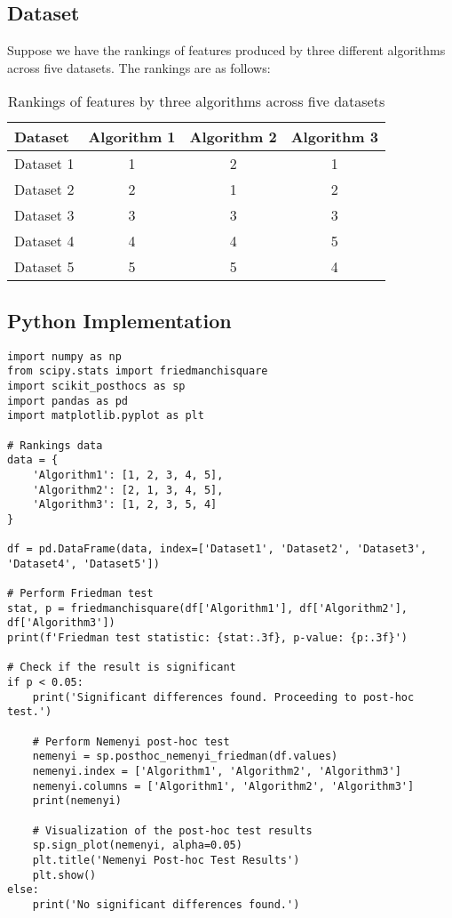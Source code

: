 \documentclass{article}
\begin{document}
\subsection*{Dataset}

Suppose we have the rankings of features produced by three different algorithms across five datasets. The rankings are as follows:

\begin{table}[h!]
\centering
\begin{tabular}{lccc}
\hline
\textbf{Dataset} & \textbf{Algorithm 1} & \textbf{Algorithm 2} & \textbf{Algorithm 3} \\
\hline
Dataset 1 & 1 & 2 & 1 \\
Dataset 2 & 2 & 1 & 2 \\
Dataset 3 & 3 & 3 & 3 \\
Dataset 4 & 4 & 4 & 5 \\
Dataset 5 & 5 & 5 & 4 \\
\hline
\end{tabular}
\caption{Rankings of features by three algorithms across five datasets}
\end{table}

\subsection*{Python Implementation}

\begin{lstlisting}[style=pythonstyle, caption={Python code for Friedman test and post-hoc analysis}]
import numpy as np
from scipy.stats import friedmanchisquare
import scikit_posthocs as sp
import pandas as pd
import matplotlib.pyplot as plt

# Rankings data
data = {
    'Algorithm1': [1, 2, 3, 4, 5],
    'Algorithm2': [2, 1, 3, 4, 5],
    'Algorithm3': [1, 2, 3, 5, 4]
}

df = pd.DataFrame(data, index=['Dataset1', 'Dataset2', 'Dataset3', 'Dataset4', 'Dataset5'])

# Perform Friedman test
stat, p = friedmanchisquare(df['Algorithm1'], df['Algorithm2'], df['Algorithm3'])
print(f'Friedman test statistic: {stat:.3f}, p-value: {p:.3f}')

# Check if the result is significant
if p < 0.05:
    print('Significant differences found. Proceeding to post-hoc test.')
    
    # Perform Nemenyi post-hoc test
    nemenyi = sp.posthoc_nemenyi_friedman(df.values)
    nemenyi.index = ['Algorithm1', 'Algorithm2', 'Algorithm3']
    nemenyi.columns = ['Algorithm1', 'Algorithm2', 'Algorithm3']
    print(nemenyi)
    
    # Visualization of the post-hoc test results
    sp.sign_plot(nemenyi, alpha=0.05)
    plt.title('Nemenyi Post-hoc Test Results')
    plt.show()
else:
    print('No significant differences found.')
\end{lstlisting}
\end{document}
